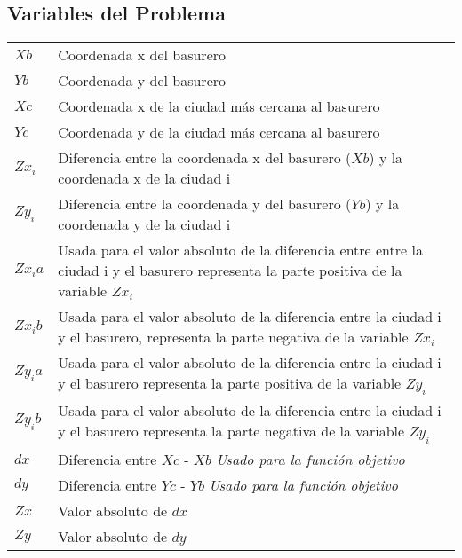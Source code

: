 \documentclass[10pt]{article}
\begin{document}
\subsection{Variables del Problema}
\begin{tabular}{l l }
$Xb$ & Coordenada x del basurero \\
$Yb$ & Coordenada y del basurero \\
$Xc$ & Coordenada x de la ciudad m\'as cercana al basurero \\
$Yc$ & Coordenada y de la ciudad m\'as cercana al basurero \\


$Zx_i$ & Diferencia entre la coordenada x del basurero ($Xb$) y la coordenada x de la ciudad i\\

$Zy_i$ & Diferencia entre la coordenada y del basurero ($Yb$) y la coordenada y de la ciudad i\\


$Zx_ia$ & Usada para el valor absoluto de la diferencia entre entre la ciudad i y el basurero representa la parte positiva de la variable $Zx_i$\\

$Zx_ib$ & Usada para el valor absoluto de la diferencia entre la ciudad i y el basurero, representa la parte negativa de la variable $Zx_i$\\


$Zy_ia$ & Usada para el valor absoluto de la diferencia entre la ciudad i y el basurero representa la parte positiva de la variable $Zy_i$\\

$Zy_ib$ & Usada para el valor absoluto de la diferencia entre la ciudad i y el basurero representa la parte negativa de la variable $Zy_i$\\



$dx$ & Diferencia entre $Xc$ - $Xb$ \emph{Usado para la funci\'on objetivo}\\

$dy$ &  Diferencia entre $Yc$ - $Yb$ \emph{Usado para la funci\'on objetivo}\\


$Zx$ & Valor absoluto de $dx$\\

$Zy$ & Valor absoluto de $dy$ \\
\end{tabular}
\end{document}
